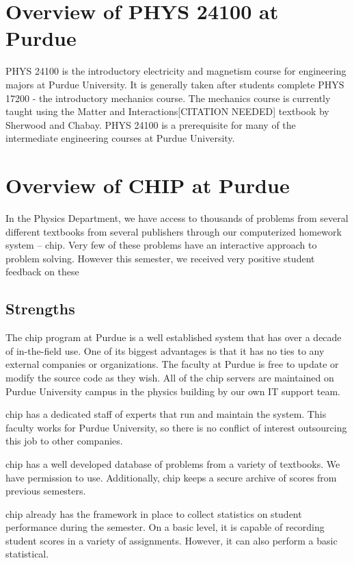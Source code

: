 \section{Overview of PHYS 24100 at Purdue}

PHYS 24100 is the introductory electricity and magnetism course for engineering majors at Purdue University. It is generally taken after students complete PHYS 17200 - the introductory mechanics course. The mechanics course is currently taught using the Matter and Interactions[CITATION NEEDED] textbook by Sherwood and Chabay. PHYS 24100 is a prerequisite for many of the intermediate engineering courses at Purdue University.

\section{Overview of CHIP at Purdue}

In the Physics Department, we have access to thousands of problems from several different
textbooks from several publishers through our computerized homework system – \gls{chip}. Very few of these problems have an interactive approach
to problem solving. However this semester, we received very positive student feedback on these

\subsection{Strengths}

The \gls{chip} program at Purdue is a well established system that has over a decade of in-the-field use. One of its biggest advantages is that it has no ties to any external companies or organizations. The faculty at Purdue is free to update or modify the source code as they wish. All of the \gls{chip} servers are maintained on Purdue University campus in the physics building by our own IT support team.

\gls{chip} has a dedicated staff of experts that run and maintain the system. This faculty works for Purdue University, so there is no conflict of interest outsourcing this job to other companies.

\gls{chip} has a well developed database of problems from a variety of textbooks. We have permission to use. Additionally, \gls{chip} keeps a secure archive of scores from previous semesters.

\gls{chip} already has the framework in place to collect statistics on student performance during the semester. On a basic level, it is capable of recording student scores in a variety of assignments. However, it can also perform a basic statistical.

